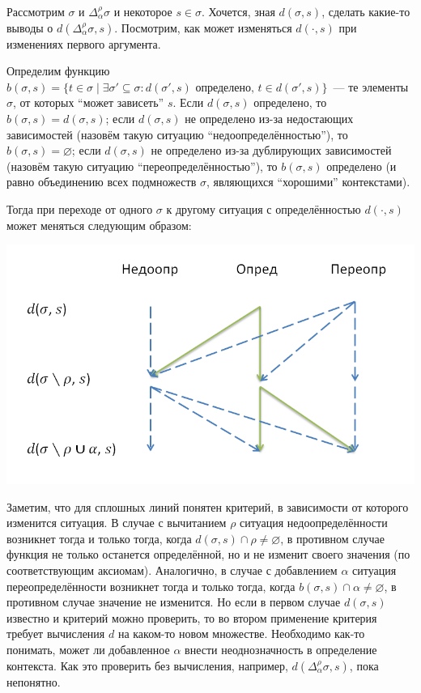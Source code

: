 



\newcommand{\Deltasigma}{\Delta_\alpha^\rho\sigma}

Рассмотрим $\sigma$ и $\Deltasigma$ и некоторое $s \in \sigma$. Хочется, зная $d(\sigma, s)$, сделать какие-то выводы о $d(\Deltasigma, s)$. Посмотрим, как может изменяться $d(\cdot, s)$ при изменениях первого аргумента.

Определим функцию $b(\sigma, s) = \{t \in \sigma \mid \exists \sigma' \subseteq \sigma : d(\sigma', s) \text{ определено, } t \in d(\sigma', s) \}$~--- те элементы $\sigma$, от которых ``может зависеть'' $s$. Если $d(\sigma, s)$ определено, то $b(\sigma, s) = d(\sigma, s)$; если $d(\sigma, s)$ не определено из-за недостающих зависимостей (назовём такую ситуацию ``недоопределённостью''), то $b(\sigma, s) = \varnothing$; если $d(\sigma, s)$ не определено из-за дублирующих зависимостей (назовём такую ситуацию ``переопределённостью''), то $b(\sigma, s)$ определено (и равно объединению всех подмножеств $\sigma$, являющихся ``хорошими'' контекстами).

Тогда при переходе от одного $\sigma$ к другому ситуация с определённостью $d(\cdot, s)$ может меняться следующим образом:

\includegraphics[scale=0.7]{compute_def_scheme}

Заметим, что для сплошных линий понятен критерий, в зависимости от которого изменится ситуация. В случае с вычитанием $\rho$ ситуация недоопределённости возникнет тогда и только тогда, когда $d(\sigma, s) \cap \rho \neq \varnothing$, в противном случае функция не только останется определённой, но и не изменит своего значения (по соответствующим аксиомам). Аналогично, в случае с добавлением $\alpha$ ситуация переопределённости возникнет тогда и только тогда, когда $b(\sigma, s) \cap \alpha \neq \varnothing$, в противном случае значение не изменится. Но если в первом случае $d(\sigma, s)$ известно и критерий можно проверить, то во втором применение критерия требует вычисления $d$ на каком-то новом множестве. Необходимо как-то понимать, может ли добавленное $\alpha$ внести неоднозначность в определение контекста. Как это проверить без вычисления, например, $d(\Deltasigma, s)$, пока непонятно.

